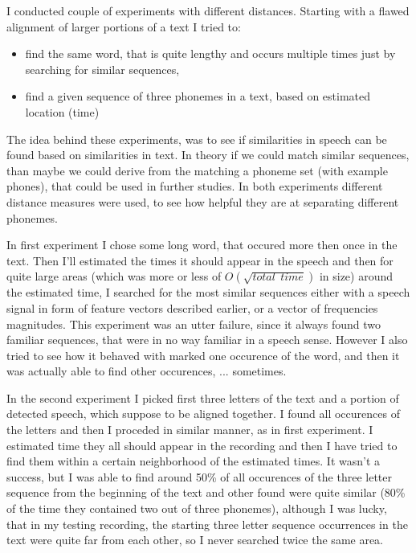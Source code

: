 \documentclass[12pt,a4paper,english]{article}
\begin{document}
I conducted couple of experiments with different distances.
Starting with a flawed alignment of larger portions of a text I tried to:
\begin{itemize}
	\item find the same word, that is quite lengthy and occurs multiple times just by searching for similar sequences,
	\item find a given sequence of three phonemes in a text, based on estimated location (time)
\end{itemize}
The idea behind these experiments, was to see if similarities in speech can be found based on similarities in text.
In theory if we could match similar sequences, than maybe we could derive from the matching a phoneme set (with example phones), that could be used in further studies. \newline
In both experiments different distance measures were used, to see how helpful they are at separating different phonemes. \newline

In first experiment I chose some long word, that occured more then once in the text. Then I'll estimated the times it should appear in the speech and then for quite large areas (which was more or less of $O(\sqrt{total \: \: time})$ in size) around the estimated time, I searched for the most similar sequences either with a speech signal in form of feature vectors described earlier, or a vector of frequencies magnitudes. \newline
This experiment was an utter failure, since it always found two familiar sequences, that were in no way familiar in a speech sense.
However I also tried to see how it behaved with marked one occurence of the word, and then it was actually able to find other occurences, ... sometimes. \newline

In the second experiment I picked first three letters of the text and a portion of detected speech, which suppose to be aligned together. I found all occurences of the letters and then I proceded in similar manner, as in first experiment. I estimated time they all should appear in the recording and then I have tried to find them within a certain neighborhood of the estimated times. It wasn't a success, but I was able to find around 50\% of all occurences of the three letter sequence from the beginning of the text and other found were quite similar (80\% of the time they contained two out of three phonemes), although I was lucky, that in my testing recording, the starting three letter sequence occurrences in the text were quite far from each other, so I never searched twice the same area. \newline
\end{document}
